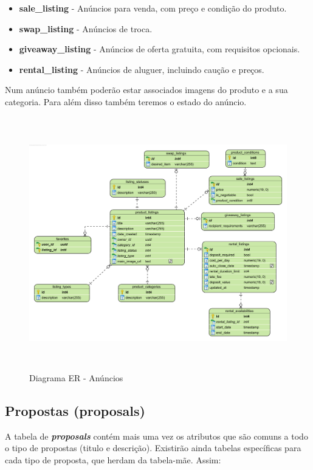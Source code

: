 \documentclass[a4paper, 12pt]{article} %
\begin{document}
\begin{itemize}
	\item \textbf{sale\_listing} - Anúncios para venda, com preço e condição do produto.
	\item \textbf{swap\_listing} - Anúncios de troca.
	\item \textbf{giveaway\_listing} - Anúncios de oferta gratuita, com requisitos opcionais.
	\item \textbf{rental\_listing} - Anúncios de aluguer, incluindo caução e preços.
\end{itemize}
Num anúncio também poderão estar associados imagens do produto e a sua categoria. Para além disso também teremos o estado do anúncio.
\begin{figure}[H]
	\centering
	\includegraphics[height=11cm]{../images/entity-relationship-product-listings.png}
	\caption{Diagrama ER - Anúncios}
	\label{fig:ER Listings}
\end{figure}

\newpage

\subsection{\textbf{Propostas (proposals)}}
A tabela de \textbf{\textit{proposals}} contém mais uma vez os atributos que são comuns a todo o tipo de propostas (titulo e descrição). Existirão ainda tabelas específicas para cada tipo de proposta, que herdam da tabela-mãe. Assim:
\end{document}
